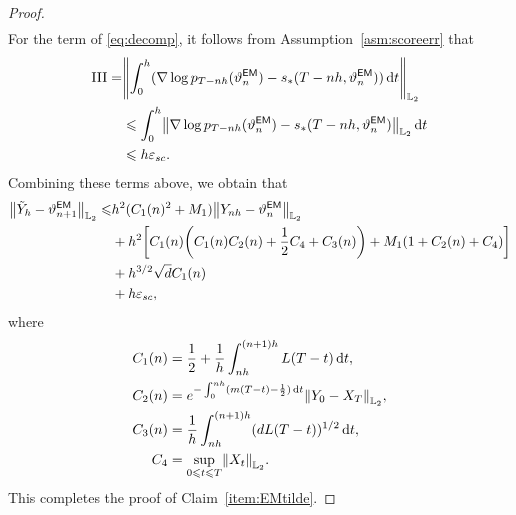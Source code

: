 \begin{proof}
\begin{equation}
\begin{aligned}
    \end{aligned}
    \label{eq:hatyn}
\end{equation}
For the term  of \eqref{eq:decomp}, it follows from Assumption~\ref{asm:scoreerr} that 
\begin{align*}
    \rm{III}=&\left\lVert\int_0^h(\nabla\log p_{T-nh}(\vartheta_n^{\sf EM})-s_*(T-nh,\vartheta_n^{\sf EM}))\rmd t\right\rVert_{\Ltwo}\\
    &\leqslant\int_0^h\l|\nabla\log p_{T-nh}(\vartheta_n^{\sf EM})-s_*(T-nh,\vartheta_n^{\sf EM})\r|_{\Ltwo}\rmd t\\
   &\leqslant h\varepsilon_{sc}.
\end{align*}
Combining these terms above, we obtain that
\begin{equation}
    \begin{aligned}
        \l|\tilde{Y}_h-\vartheta_{n+1}^{\sf EM}\r|_{\Ltwo}\leqslant& h^2(C_1(n)^2+M_1)\l|Y_{nh}-\vartheta_n^{\sf EM}\r|_{\Ltwo}\\
        &+h^2\left[C_1(n)\left(C_1(n)C_2(n)+\dfrac{1}{2}C_4+C_3(n)\right)+M_1\left(1+C_2(n)+C_4\right)\right]\\
        &+h^{3/2}\sqrt{d}C_1(n)\\
        &+h\varepsilon_{sc},
    \end{aligned}
    \label{eq:EM2term}
\end{equation}
where
\begin{align*}
    C_1(n)&=\dfrac{1}{2}+\dfrac{1}{h}\int_{nh}^{(n+1)h}L(T-t)\rmd t,\\
    C_2(n)&=e^{-\int_0^{nh}(m(T-t)-\frac{1}{2})\rmd t}\l|Y_0-X_T\r|_{\Ltwo},\\
    C_3(n)&=\dfrac{1}{h}\int_{nh}^{(n+1)h}(dL(T-t))^{1/2}\rmd t,\\
    C_4&=\sup_{0\leqslant t\leqslant T}\l|X_t\r|_{\Ltwo}.
\end{align*}
This completes the proof of Claim~\ref{item:EMtilde}.


\end{proof}
